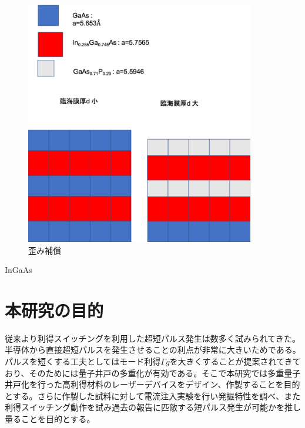 \begin{figure}[h]
	\centering
	\includegraphics[width=10cm]{figure/fig_1_1_lattice_strain.png}
	\caption{歪み補償}
	\label{fig:fig_1_1_lattice_strain_comp}
\end{figure}
InGaAs


\clearpage
\section{本研究の目的}

従来より利得スイッチングを利用した超短パルス発生は数多く試みられてきた。半導体から直接超短パルスを発生させることの利点が非常に大きいためである。パルスを短くする工夫としてはモード利得$\Gamma g$を大きくすることが提案されてきており、そのためには量子井戸の多重化が有効である。そこで本研究では多重量子井戸化を行った高利得材料のレーザーデバイスをデザイン、作製することを目的とする。さらに作製した試料に対して電流注入実験を行い発振特性を調べ、また利得スイッチング動作を試み過去の報告に匹敵する短パルス発生が可能かを推し量ることを目的とする。